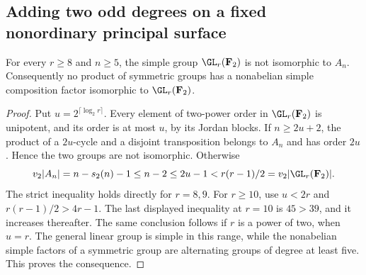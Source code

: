 \subsection{Adding two odd degrees on a fixed nonordinary principal surface}
\label{subsec:nonordinary-even-addition-candidate}

\begin{lemma}
\label{lem:nonordinary-addition-simple-group-separation-candidate}
For every $r\ge8$ and $n\ge5$, the simple group
$\GL_r(\mathbf F_2)$ is not isomorphic to $A_n$.
Consequently no product of symmetric groups has a nonabelian
simple composition factor isomorphic to $\GL_r(\mathbf F_2)$.
\end{lemma}
\begin{proof}
Put $u=2^{\lceil\log_2 r\rceil}$. Every element of two-power
order in $\GL_r(\mathbf F_2)$ is unipotent, and its order is at
most $u$, by its Jordan blocks. If $n\ge2u+2$, the product of
a $2u$-cycle and a disjoint transposition belongs to $A_n$ and
has order $2u$. Hence the two groups are not isomorphic.
Otherwise
\[
       v_2|A_n|=n-s_2(n)-1\le n-2\le2u-1
                           < r(r-1)/2=v_2|\GL_r(\mathbf F_2)|.
\]
The strict inequality holds directly for $r=8,9$. For $r\ge10$,
use $u<2r$ and $r(r-1)/2>4r-1$. The last displayed inequality
at $r=10$ is $45>39$, and it increases thereafter. The same
conclusion follows if $r$ is a power of two, when $u=r$.
The general linear group is simple in this range, while the
nonabelian simple factors of a symmetric group are alternating
groups of degree at least five. This proves the consequence.
\end{proof}


